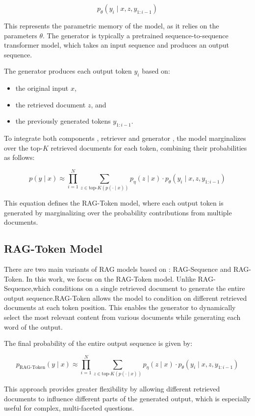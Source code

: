 \documentclass[%
    paper=A4,                    %
    twoside=true,               %
    openright,                  %
    parskip=full,               %
    chapterprefix=true,         %
    11pt,                       %
    headings=normal,            %
    bibliography=totoc,         %
    listof=totoc,              %
    titlepage=on,              %
    captions=tableabove,        %
    draft=false,               %
]{scrreprt}%
\begin{document}
\[
p_{\theta}(y_i \mid x, z, y_{1:i-1})
\]

This represents the parametric memory of the model, as it relies on the parameters \( \theta \). The generator is typically a pretrained sequence-to-sequence transformer model, which takes an input sequence and produces an output sequence.

The generator produces each output token \( y_i \) based on:
\begin{itemize}
	\item the original input \( x \),
	\item the retrieved document \( z \), and
	\item the previously generated tokens \( y_{1:i-1} \).
\end{itemize}

To integrate both components , retriever and generator , the model marginalizes over the top-\( K \) retrieved documents for each token, combining their probabilities as follows:

\[
p(y \mid x) \approx \prod_{i=1}^{N} \sum_{z \in \text{top-}K(p(\cdot \mid x))} p_\eta(z \mid x) \cdot p_\theta(y_i \mid x, z, y_{1:i-1})
\]

This equation defines the RAG-Token model, where each output token is generated by marginalizing over the probability contributions from multiple documents.


\subsection*{RAG-Token Model}

There are two main variants of RAG models based on \cite{lewis2020}: RAG-Sequence and RAG-Token. In this work, we focus on the RAG-Token model.
Unlike RAG-Sequence,which conditions on a single retrieved document to generate the entire output sequence.RAG-Token allows the model to condition on different retrieved documents at each token position. This enables the generator to dynamically select the most relevant content from various documents while generating each word of the output.

The final probability of the entire output sequence is given by:

\[
p_{\text{RAG-Token}}(y \mid x) \approx \prod_{i=1}^{N} \sum_{z \in \text{top-}K(p(\cdot \mid x))} p_\eta(z \mid x) \cdot p_\theta(y_i \mid x, z, y_{1:i-1})
\]

This approach provides greater flexibility by allowing different retrieved documents to influence different parts of the generated output, which is especially useful for complex, multi-faceted questions.
\end{document}
